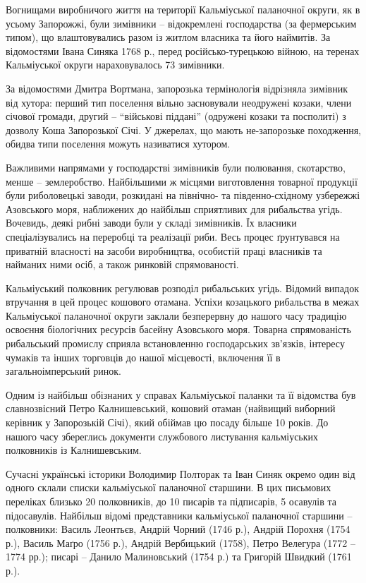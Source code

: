 Вогнищами виробничого життя на території Кальміуської паланочної округи, як в
усьому Запорожжі, були зимівники – відокремлені господарства (за фермерським
типом), що влаштовувались разом із житлом власника та його наймитів. За
відомостями Івана Синяка 1768 р., перед російсько-турецькою війною, на теренах
Кальміуської округи нараховувалось 73 зимівники.


За відомостями Дмитра Вортмана, запорозька термінологія відрізняла зимівник від
хутора: перший тип поселення вільно засновували неодружені козаки, члени
січової громади, другий – \enquote{військові піддані} (одружені козаки та посполиті) з
дозволу Коша Запорозької Січі. У джерелах, що мають не-запорозьке походження,
обидва типи поселення можуть називатися хутором.

Важливими напрямами у господарстві зимівників були полювання, скотарство, менше
– землеробство. Найбільшими ж місцями виготовлення товарної продукції були
риболовецькі заводи, розкидані на північно- та південно-східному узбережжі
Азовського моря, наближених до найбільш сприятливих для рибальства угідь.
Вочевидь, деякі рибні заводи були у складі зимівників. Їх власники
спеціалізувались на переробці та реалізації риби. Весь процес ґрунтувався на
приватній власності на засоби виробництва, особистій праці власників та
найманих ними осіб, а також ринковій спрямованості. 

Кальміуський полковник регулював розподіл рибальських угідь. Відомий випадок
втручання в цей процес кошового отамана. Успіхи козацького рибальства в межах
Кальміуської паланочної округи заклали безперервну до нашого часу традицію
освоєння біологічних ресурсів басейну Азовського моря. Товарна спрямованість
рибальський промислу сприяла встановленню господарських зв'язків, інтересу
чумаків та інших торговців до нашої місцевості, включення її в
загальноімперський ринок.

Одним із найбільш обізнаних  у справах Кальміуської паланки та її відомства був
славнозвісний Петро Калнишевський, кошовий отаман (найвищий виборний керівник у
Запорозькій Січі), який обіймав цю посаду більше 10 років. До нашого часу
збереглись документи службового листування кальміуських полковників із
Калнишевським. 

Сучасні українські історики Володимир Полторак та Іван Синяк окремо один від
одного склали списки кальміуської паланочної старшини. В цих письмових
переліках близько 20 полковників, до 10 писарів та підписарів, 5 осавулів та
підосавулів. Найбільш відомі представники кальміуської паланочної старшини –
полковники: Василь Леонтьєв, Андрій Чорний (1746 р.), Андрій Порохня (1754 р.),
Василь Маґро (1756 р.), Андрій Вербицький (1758), Петро Велегура (1772 –1774
рр.); писарі – Данило Малиновський (1754 р.) та Григорій Швидкий (1761 р.).

